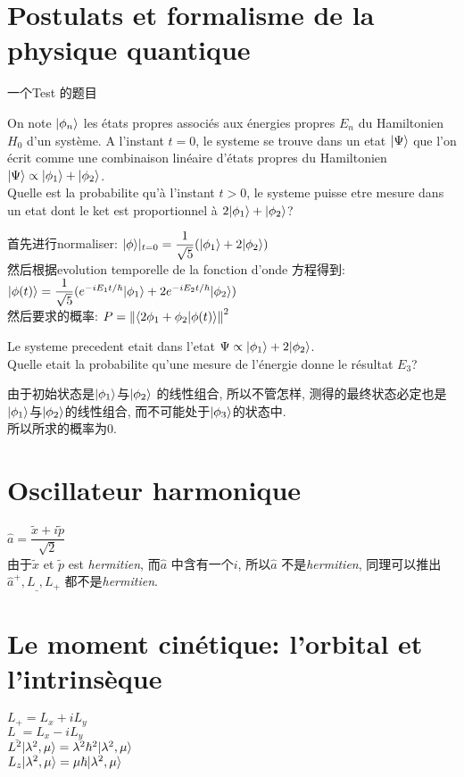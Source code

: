 \documentclass{article}
\begin{document}
\section{Postulats et formalisme de la physique quantique}
一个Test 的题目
\begin{example}
On note $|\phi_n\rangle$ les \'etats propres associ\'es aux \'energies propres $E_n$ du Hamiltonien $H_0$ d'un syst\`eme.
A l'instant $t=0$, le systeme se trouve dans un etat $|\Psi\rangle$ que l'on \'ecrit comme une combinaison lin\'eaire d'\'etats propres
du Hamiltonien $|\Psi\rangle \propto |\phi_1\rangle + |\phi_2\rangle$.\\
Quelle est la probabilite qu'\`a l'instant $t>0$, le systeme puisse etre mesure dans un etat dont le ket est proportionnel \`a $2 |\phi_1\rangle + |\phi_2\rangle$? \par
首先进行normaliser: $|\phi\rangle|_{t = 0} = \dfrac{1}{\sqrt{5}} ( |\phi_1\rangle + 2 |\phi_2\rangle)$\\
然后根据evolution temporelle de la fonction d'onde 方程得到: $|\phi(t)\rangle = \dfrac{1}{\sqrt{5}} ( e^{-iE_1 t/ \hbar} |\phi_1\rangle + 2 e^{-iE_2 t/\hbar} |\phi_2\rangle)$\\
然后要求的概率: $P = \left\Vert \langle 2\phi_1 + \phi_2| \phi(t) \rangle\right\Vert^2$

\bigskip
Le systeme precedent etait dans l'etat $\Psi \propto |\phi_1\rangle + 2 |\phi_2\rangle$.\\
Quelle etait la probabilite qu'une mesure de l'\'energie donne le r\'esultat $E_3$? \par
由于初始状态是$|\phi_1\rangle $与$|\phi_2\rangle$ 的线性组合, 所以不管怎样, 测得的最终状态必定也是$|\phi_1\rangle $与$|\phi_2\rangle$的线性组合, 而不可能处于$|\phi_3\rangle$的状态中.\\
所以所求的概率为$0$.
\end{example}

\section{Oscillateur harmonique}
$\hat{a} = \dfrac{\tilde{x} + i\tilde{p}}{\sqrt{2}}$\\
由于$\tilde{x}$ et $\tilde{p}$ est \textit{hermitien}, 而$\hat{a}$ 中含有一个$i$, 所以$\hat{a}$ 不是\textit{hermitien}, 
同理可以推出$\hat{a}^+, L_{\_}, L_+$ 都不是\textit{hermitien}.

\section{Le moment cin\'etique: l'orbital et l'intrins\`eque}
\noindent
$L_+ = L_x + i L_y$\\
$L_{\_} = L_x - i L_y$\\
$L^2|\lambda^2,\mu\rangle = \lambda^2 \hbar^2 |\lambda^2,\mu\rangle$\\
$L_z|\lambda^2,\mu\rangle = \mu \hbar |\lambda^2,\mu\rangle$
\end{document}
